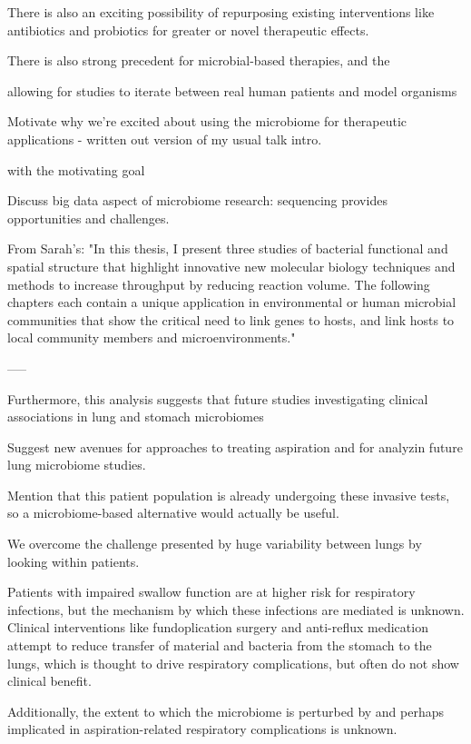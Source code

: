 There is also an exciting possibility of repurposing existing interventions like antibiotics and probiotics for greater or novel therapeutic effects.

There is also strong precedent for microbial-based therapies, and the

allowing for studies to iterate between real human patients and model organisms

Motivate why we're excited about using the microbiome for therapeutic applications - written out version of my usual talk intro.

with the motivating goal

Discuss big data aspect of microbiome research: sequencing provides opportunities and challenges.

From Sarah's: "In this thesis, I present three studies of bacterial functional and spatial structure that highlight innovative new molecular biology techniques and methods to increase throughput by reducing reaction volume. The following chapters each contain a unique application in environmental or human microbial communities that show the critical need to link genes to hosts, and link hosts to local community members and microenvironments."

-----

Furthermore, this analysis suggests that future studies investigating clinical associations in lung and stomach microbiomes

Suggest new avenues for approaches to treating aspiration and for analyzin future lung microbiome studies.

Mention that this patient population is already undergoing these invasive tests, so a microbiome-based alternative would actually be useful.

We overcome the challenge presented by huge variability between lungs by looking within patients.

Patients with impaired swallow function are at higher risk for respiratory infections, but the mechanism by which these infections are mediated is unknown.
Clinical interventions like fundoplication surgery and anti-reflux medication attempt to reduce transfer of material and bacteria from the stomach to the lungs, which is thought to drive respiratory complications, but often do not show clinical benefit.

Additionally, the extent to which the microbiome is perturbed by and perhaps implicated in aspiration-related respiratory complications is unknown.

